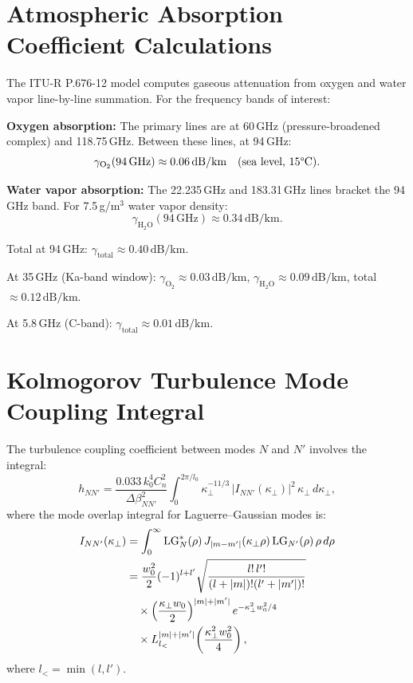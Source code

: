 \documentclass[journal,twocolumn]{IEEEtran}
\newcommand{\LG}{\mathrm{LG}}
\begin{document}
\section{Atmospheric Absorption Coefficient Calculations}\label{app:atmos}

The ITU-R P.676-12 model computes gaseous attenuation from oxygen and
water vapor line-by-line summation. For the frequency bands of interest:

\textbf{Oxygen absorption:} The primary lines are at 60\,GHz
(pressure-broadened complex) and 118.75\,GHz. Between these lines,
at 94\,GHz:
\begin{equation}
\gamma_{\text{O}_2}(94\,\text{GHz}) \approx 0.06\,\text{dB/km}
\quad (\text{sea level, 15\textdegree C}).
\end{equation}

\textbf{Water vapor absorption:} The 22.235\,GHz and 183.31\,GHz lines
bracket the 94\,GHz band. For 7.5\,g/m$^3$ water vapor density:
\begin{equation}
\gamma_{\text{H}_2\text{O}}(94\,\text{GHz}) \approx 0.34\,\text{dB/km}.
\end{equation}

Total at 94\,GHz: $\gamma_\text{total} \approx 0.40\,\text{dB/km}$.

At 35\,GHz (Ka-band window):
$\gamma_{\text{O}_2} \approx 0.03\,\text{dB/km}$,
$\gamma_{\text{H}_2\text{O}} \approx 0.09\,\text{dB/km}$,
total $\approx 0.12\,\text{dB/km}$.

At 5.8\,GHz (C-band):
$\gamma_\text{total} \approx 0.01\,\text{dB/km}$.

\section{Kolmogorov Turbulence Mode Coupling Integral}\label{app:turb}

The turbulence coupling coefficient between modes $N$ and $N'$ involves
the integral:
\begin{equation}
h_{NN'} = \frac{0.033\,k_0^4 C_n^2}{\Delta\beta_{NN'}^2}
\int_0^{2\pi/l_0} \kappa_\perp^{-11/3}\,|I_{NN'}(\kappa_\perp)|^2\,
\kappa_\perp\,d\kappa_\perp,
\end{equation}
where the mode overlap integral for Laguerre--Gaussian modes is:
\begin{align}
I_{NN'}(\kappa_\perp) &= \int_0^\infty \LG_N^*(\rho)\,
J_{|m-m'|}(\kappa_\perp\rho)\,\LG_{N'}(\rho)\,\rho\,d\rho \notag\\
&= \frac{w_0^2}{2}(-1)^{l+l'}\sqrt{\frac{l!\,l'!}{(l+|m|)!(l'+|m'|)!}}
\notag\\
&\quad\times \left(\frac{\kappa_\perp w_0}{2}\right)^{|m|+|m'|}
e^{-\kappa_\perp^2 w_0^2/4}\notag\\
&\quad\times L_{l_<}^{|m|+|m'|}\!\left(\frac{\kappa_\perp^2 w_0^2}{4}\right),
\end{align}
where $l_< = \min(l,l')$.
\end{document}
